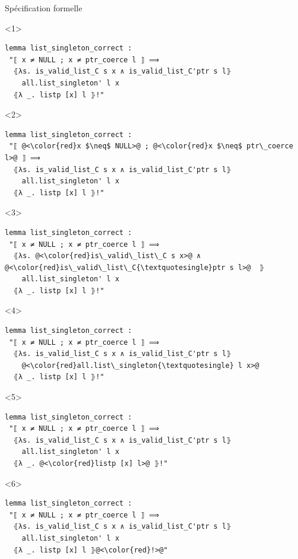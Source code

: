 \documentclass[hyperref={pdfpagelabels=false}]{beamer}
\begin{document}
\begin{frame}[fragile]{Spécification formelle}
  \begin{center}
    \begin{minipage}{0.85\textwidth}
      \begin{onlyenv}<1>
        \begin{lstlisting}
lemma list_singleton_correct :
 "⟦ x ≠ NULL ; x ≠ ptr_coerce l ⟧ ⟹ 
  ⦃λs. is_valid_list_C s x ∧ is_valid_list_C'ptr s l⦄
    all.list_singleton' l x
  ⦃λ _. listp [x] l ⦄!"
        \end{lstlisting}
      \end{onlyenv}

    \begin{onlyenv}<2>
    \begin{lstlisting}
lemma list_singleton_correct :
 "⟦ @<\color{red}x $\neq$ NULL>@ ; @<\color{red}x $\neq$ ptr\_coerce l>@ ⟧ ⟹ 
  ⦃λs. is_valid_list_C s x ∧ is_valid_list_C'ptr s l⦄
    all.list_singleton' l x
  ⦃λ _. listp [x] l ⦄!"
    \end{lstlisting}
  \end{onlyenv}

  \begin{onlyenv}<3>
    \begin{lstlisting}
lemma list_singleton_correct :
 "⟦ x ≠ NULL ; x ≠ ptr_coerce l ⟧ ⟹ 
  ⦃λs. @<\color{red}is\_valid\_list\_C s x>@ ∧ @<\color{red}is\_valid\_list\_C{\textquotesingle}ptr s l>@  ⦄
    all.list_singleton' l x
  ⦃λ _. listp [x] l ⦄!"
    \end{lstlisting}
  \end{onlyenv}

  \begin{onlyenv}<4>
    \begin{lstlisting}
lemma list_singleton_correct :
 "⟦ x ≠ NULL ; x ≠ ptr_coerce l ⟧ ⟹ 
  ⦃λs. is_valid_list_C s x ∧ is_valid_list_C'ptr s l⦄
    @<\color{red}all.list\_singleton{\textquotesingle} l x>@
  ⦃λ _. listp [x] l ⦄!"
    \end{lstlisting}
  \end{onlyenv}

  \begin{onlyenv}<5>
    \begin{lstlisting}
lemma list_singleton_correct :
 "⟦ x ≠ NULL ; x ≠ ptr_coerce l ⟧ ⟹ 
  ⦃λs. is_valid_list_C s x ∧ is_valid_list_C'ptr s l⦄
    all.list_singleton' l x
  ⦃λ _. @<\color{red}listp [x] l>@ ⦄!"
    \end{lstlisting}
  \end{onlyenv}
  \begin{onlyenv}<6>
    \begin{lstlisting}
lemma list_singleton_correct :
 "⟦ x ≠ NULL ; x ≠ ptr_coerce l ⟧ ⟹ 
  ⦃λs. is_valid_list_C s x ∧ is_valid_list_C'ptr s l⦄
    all.list_singleton' l x
  ⦃λ _. listp [x] l ⦄@<\color{red}!>@"
    \end{lstlisting}
  \end{onlyenv}
\end{minipage}
  \end{center}


\end{frame}
\end{document}
